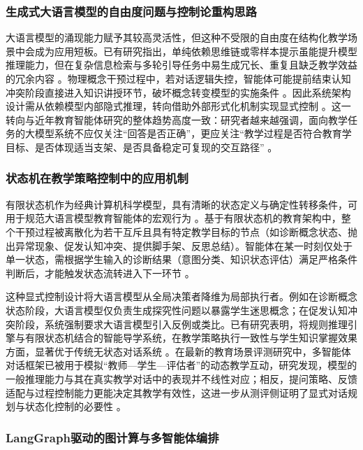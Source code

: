 \subsubsection{生成式大语言模型的自由度问题与控制论重构思路}

大语言模型的涌现能力赋予其较高灵活性，但这种不受限的自由度在结构化教学场景中会成为应用短板。已有研究指出，单纯依赖思维链或零样本提示虽能提升模型推理能力，但在复杂信息检索与多轮引导任务中易生成冗长、重复且缺乏教学效益的冗余内容 \citep{ref38}。物理概念干预过程中，若对话逻辑失控，智能体可能提前结束认知冲突阶段直接进入知识讲授环节，破坏概念转变模型的实施条件 \citep{ref36}。因此系统架构设计需从依赖模型内部隐式推理，转向借助外部形式化机制实现显式控制 \citep{ref35}。这一转向与近年教育智能体研究的整体趋势高度一致：研究者越来越强调，面向教学任务的大模型系统不应仅关注“回答是否正确”，更应关注“教学过程是否符合教育学目标、是否体现适当支架、是否具备稳定可复现的交互路径” \citep{xing2025llmeducation,chen2025agentinedu}。

\subsubsection{状态机在教学策略控制中的应用机制}

有限状态机作为经典计算机科学模型，具有清晰的状态定义与确定性转移条件，可用于规范大语言模型教育智能体的宏观行为 \citep{ref30}。基于有限状态机的教育架构中，整个干预过程被离散化为若干互斥且具有特定教学目标的节点（如诊断概念状态、抛出异常现象、促发认知冲突、提供脚手架、反思总结）。智能体在某一时刻仅处于单一状态，需根据学生输入的诊断结果（意图分类、知识状态评估）满足严格条件判断后，才能触发状态流转进入下一环节 \citep{ref52}。

这种显式控制设计将大语言模型从全局决策者降维为局部执行者。例如在诊断概念状态阶段，大语言模型仅负责生成探究性问题以暴露学生迷思概念；在促发认知冲突阶段，系统强制要求大语言模型引入反例或类比。已有研究表明，将规则推理引擎与有限状态机结合的智能导学系统，在教学策略执行一致性与学生知识掌握效果方面，显著优于传统无状态对话系统 \citep{ref30}。在最新的教育场景评测研究中，多智能体对话框架已被用于模拟“教师—学生—评估者”的动态教学互动，研究发现，模型的一般推理能力与其在真实教学对话中的表现并不线性对应；相反，提问策略、反馈适配与过程控制能力更能决定其教学有效性，这进一步从测评侧证明了显式对话规划与状态化控制的必要性 \citep{shi2025educationq,weib2025elmes}。

\subsubsection{LangGraph驱动的图计算与多智能体编排}

